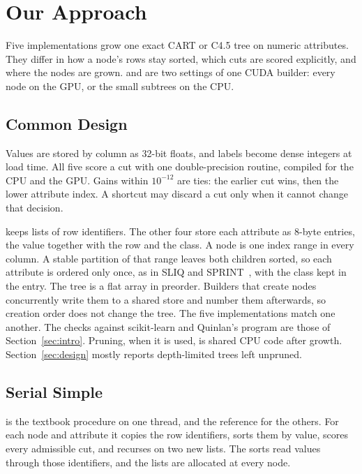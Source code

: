 \section{Our Approach}
\label{sec:impl}

Five implementations grow one exact CART or C4.5 tree on numeric attributes. They differ in how a node's rows stay sorted, which cuts are scored explicitly, and where the nodes are grown. \ImplGpu{} and \ImplHybrid{} are two settings of one CUDA builder: every node on the GPU, or the small subtrees on the CPU.

\subsection{Common Design}
\label{sec:impl-common}

Values are stored by column as 32-bit floats, and labels become dense integers at load time. All five score a cut with one double-precision routine, compiled for the CPU and the GPU. Gains within \(10^{-12}\) are ties: the earlier cut wins, then the lower attribute index. A shortcut may discard a cut only when it cannot change that decision.

\ImplSerialBase{} keeps lists of row identifiers. The other four store each attribute as 8-byte entries, the value together with the row and the class. A node is one index range in every column. A stable partition of that range leaves both children sorted, so each attribute is ordered only once, as in SLIQ and SPRINT~\cite{mehta1996sliq,shafer1996sprint}, with the class kept in the entry. The tree is a flat array in preorder. Builders that create nodes concurrently write them to a shared store and number them afterwards, so creation order does not change the tree. The five implementations match one another. The checks against scikit-learn and Quinlan's program are those of Section~\ref{sec:intro}. Pruning, when it is used, is shared CPU code after growth. Section~\ref{sec:design} mostly reports depth-limited trees left unpruned.

\subsection{Serial Simple}
\label{sec:impl-simple}

\ImplSerialBase{} is the textbook procedure on one thread, and the reference for the others. For each node and attribute it copies the row identifiers, sorts them by value, scores every admissible cut, and recurses on two new lists. The sorts read values through those identifiers, and the lists are allocated at every node.

